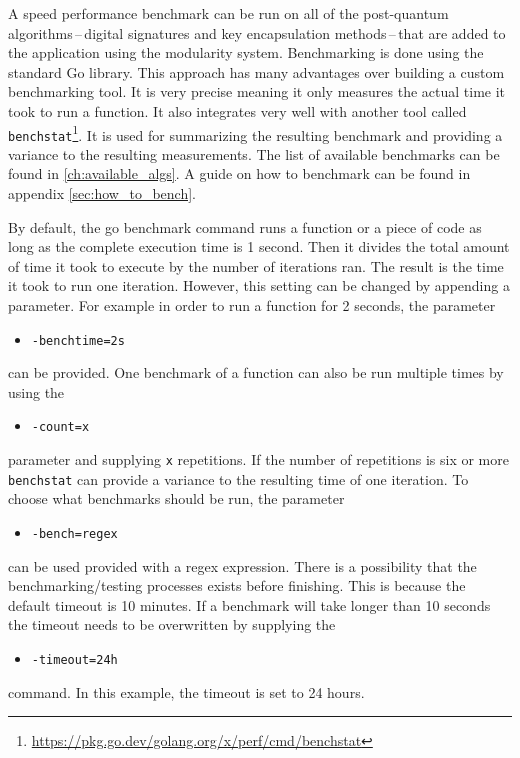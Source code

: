 A speed performance benchmark can be run on all of the post-quantum algorithms\,--\,digital signatures and key encapsulation methods\,--\,that are added to the application using the modularity system. Benchmarking is done using the standard Go library. This approach has many advantages over building a custom benchmarking tool. It is very precise meaning it only measures the actual time it took to run a function.
It also integrates very well with another tool called \texttt{benchstat}\footnote{\url{https://pkg.go.dev/golang.org/x/perf/cmd/benchstat}}. It is used for summarizing the resulting benchmark and providing a variance to the resulting measurements. The list of available benchmarks can be found in \ref{ch:available_algs}. A guide on how to benchmark can be found in appendix \ref{sec:how_to_bench}.

By default, the go benchmark command runs a function or a piece of code as long as the complete execution time is 1 second. Then it divides the total amount of time it took to execute by the number of iterations ran. The result is the time it took to run one iteration. However, this setting can be changed by appending a parameter. For example in order to run a function for 2 seconds, the parameter
\begin{itemize}
  \item \texttt{-benchtime=2s}
\end{itemize}
can be provided. One benchmark of a function can also be run multiple times by using the
\begin{itemize}
  \item \texttt{-count=x}
\end{itemize}
parameter and supplying \texttt{x} repetitions. If the number of repetitions is six or more \texttt{benchstat} can provide a variance to the resulting time of one iteration. To choose what benchmarks should be run, the parameter
\begin{itemize}
  \item \texttt{-bench=regex}
\end{itemize}
can be used provided with a regex expression. There is a possibility that the benchmarking/testing processes exists before finishing. This is because the default timeout is 10 minutes. If a benchmark will take longer than 10 seconds the timeout needs to be overwritten by supplying the
\begin{itemize}
  \item \texttt{-timeout=24h}
\end{itemize}
command. In this example, the timeout is set to 24 hours.
